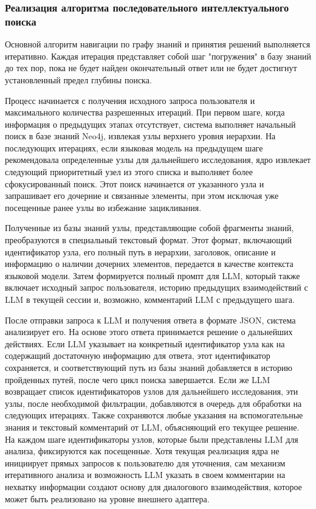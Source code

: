 \subsubsection{Реализация алгоритма последовательного интеллектуального поиска}

Основной алгоритм навигации по графу знаний и принятия решений выполняется итеративно. Каждая итерация представляет собой шаг "погружения" в базу знаний до тех пор, пока не будет найден окончательный ответ или не будет достигнут установленный предел глубины поиска.

Процесс начинается с получения исходного запроса пользователя и максимального количества разрешенных итераций. При первом шаге, когда информация о предыдущих этапах отсутствует, система выполняет начальный поиск в базе знаний Neo4j, извлекая узлы верхнего уровня иерархии. На последующих итерациях, если языковая модель на предыдущем шаге рекомендовала определенные узлы для дальнейшего исследования, ядро извлекает следующий приоритетный узел из этого списка и выполняет более сфокусированный поиск. Этот поиск начинается от указанного узла и запрашивает его дочерние и связанные элементы, при этом исключая уже посещенные ранее узлы во избежание зацикливания.

Полученные из базы знаний узлы, представляющие собой фрагменты знаний, преобразуются в специальный текстовый формат. Этот формат, включающий идентификатор узла, его полный путь в иерархии, заголовок, описание и информацию о наличии дочерних элементов, передается в качестве контекста языковой модели. Затем формируется полный промпт для LLM, который также включает исходный запрос пользователя, историю предыдущих взаимодействий с LLM в текущей сессии и, возможно, комментарий LLM с предыдущего шага.

После отправки запроса к LLM и получения ответа в формате JSON, система анализирует его. На основе этого ответа принимается решение о дальнейших действиях. Если LLM указывает на конкретный идентификатор узла как на содержащий достаточную информацию для ответа, этот идентификатор сохраняется, и соответствующий путь из базы знаний добавляется в историю пройденных путей, после чего цикл поиска завершается. Если же LLM возвращает список идентификаторов узлов для дальнейшего исследования, эти узлы, после необходимой фильтрации, добавляются в очередь для обработки на следующих итерациях. Также сохраняются любые указания на вспомогательные знания и текстовый комментарий от LLM, объясняющий его текущее решение. На каждом шаге идентификаторы узлов, которые были представлены LLM для анализа, фиксируются как посещенные. Хотя текущая реализация ядра не инициирует прямых запросов к пользователю для уточнения, сам механизм итеративного анализа и возможность LLM указать в своем комментарии на нехватку информации создают основу для диалогового взаимодействия, которое может быть реализовано на уровне внешнего адаптера.

